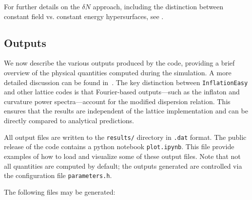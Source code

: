\documentclass[aps, nofootinbib,superscriptaddress, preprintnumbers, longbibliography]{article}
\begin{document}
For further details on the $\delta N$ approach, including the distinction between constant field vs. constant energy hypersurfaces, see \cite{USR2}.
\subsection{Outputs}
\label{sec:output}

We now describe the various outputs produced by the code, providing a brief overview of the physical quantities computed during the simulation. A more detailed discussion can be found in~\cite{Caravano:2022yyv}. The key distinction between \texttt{InflationEasy} and other lattice codes is that Fourier-based outputs—such as the inflaton and curvature power spectra—account for the modified dispersion relation. This ensures that the results are independent of the lattice implementation and can be directly compared to analytical predictions.

All output files are written to the \texttt{results/} directory in \texttt{.dat} format. The public release of the code contains a python notebook \texttt{plot.ipynb}. This file provide examples of how to load and visualize some of these output files. Note that not all quantities are computed by default; the outputs generated are controlled via the configuration file \texttt{parameters.h}.

The following files may be generated:
\end{document}

